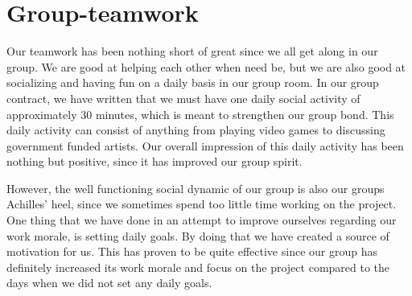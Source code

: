 \section{Group-teamwork}
Our teamwork has been nothing short of great since we all get along in our group. We are good at helping each other when need be, but we are also good at socializing and having fun on a daily basis in our group room. In our group contract, we have written that we must have one daily social activity of approximately 30 minutes, which is meant to strengthen our group bond. This daily activity can consist of anything from playing video games to discussing government funded artists. 
Our overall impression of this daily activity has been nothing but positive, since it has improved our group spirit.

However, the well functioning social dynamic of our group is also our groups Achilles' heel, since we sometimes spend too little time working on the project. One thing that we have done in an attempt to improve ourselves regarding our work morale, is setting daily goals. By doing that we have created a source of motivation for us. This has proven to be quite effective since our group has definitely increased its work morale and focus on the project compared to the days when we did not set any daily goals. 
